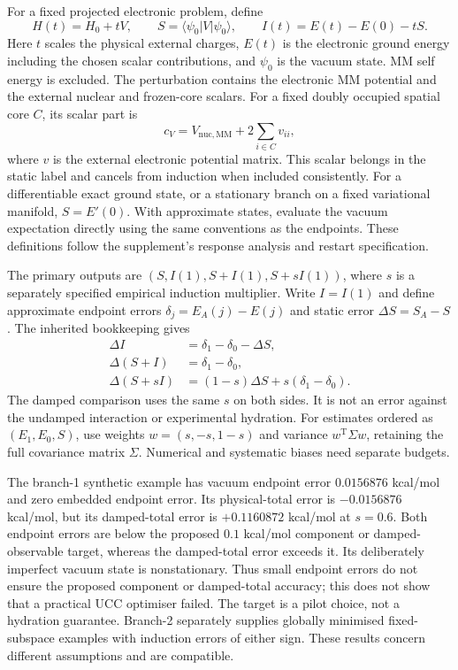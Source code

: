 \documentclass{article}
\begin{document}
For a fixed projected electronic problem, define
\begin{equation*}
H(t)=H_0+tV,\qquad S=\langle\psi_0|V|\psi_0\rangle,\qquad I(t)=E(t)-E(0)-tS.
\end{equation*}
Here $t$ scales the physical external charges, $E(t)$ is the electronic ground energy including the chosen scalar contributions, and $\psi_0$ is the vacuum state. MM self energy is excluded. The perturbation contains the electronic MM potential and the external nuclear and frozen-core scalars. For a fixed doubly occupied spatial core $C$, its scalar part is
\begin{equation*}
c_V=V_{\mathrm{nuc,MM}}+2\sum_{i\in C}v_{ii},
\end{equation*}
where $v$ is the external electronic potential matrix. This scalar belongs in the static label and cancels from induction when included consistently. For a differentiable exact ground state, or a stationary branch on a fixed variational manifold, $S=E'(0)$. With approximate states, evaluate the vacuum expectation directly using the same conventions as the endpoints. These definitions follow the supplement's response analysis and restart specification.

The primary outputs are $(S,I(1),S+I(1),S+sI(1))$, where $s$ is a separately specified empirical induction multiplier. Write $I=I(1)$ and define approximate endpoint errors $\delta_j=E_A(j)-E(j)$ and static error $\Delta S=S_A-S$. The inherited bookkeeping gives
\begin{align*}
\Delta I&=\delta_1-\delta_0-\Delta S,\\
\Delta(S+I)&=\delta_1-\delta_0,\\
\Delta(S+sI)&=(1-s)\Delta S+s(\delta_1-\delta_0).
\end{align*}
The damped comparison uses the same $s$ on both sides. It is not an error against the undamped interaction or experimental hydration. For estimates ordered as $(E_1,E_0,S)$, use weights $w=(s,-s,1-s)$ and variance $w^{\mathrm T}\Sigma w$, retaining the full covariance matrix $\Sigma$. Numerical and systematic biases need separate budgets.

The branch-1 synthetic example has vacuum endpoint error $0.0156876$ kcal/mol and zero embedded endpoint error. Its physical-total error is $-0.0156876$ kcal/mol, but its damped-total error is $+0.1160872$ kcal/mol at $s=0.6$. Both endpoint errors are below the proposed $0.1$ kcal/mol component or damped-observable target, whereas the damped-total error exceeds it. Its deliberately imperfect vacuum state is nonstationary. Thus small endpoint errors do not ensure the proposed component or damped-total accuracy; this does not show that a practical UCC optimiser failed. The target is a pilot choice, not a hydration guarantee. Branch-2 separately supplies globally minimised fixed-subspace examples with induction errors of either sign. These results concern different assumptions and are compatible.
\end{document}
